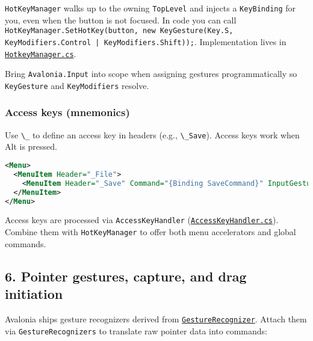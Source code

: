 \passthrough{\lstinline!HotKeyManager!} walks up to the owning
\passthrough{\lstinline!TopLevel!} and injects a
\passthrough{\lstinline!KeyBinding!} for you, even when the button is
not focused. In code you can call
\passthrough{\lstinline!HotKeyManager.SetHotKey(button, new KeyGesture(Key.S, KeyModifiers.Control | KeyModifiers.Shift));!}.
Implementation lives in
\href{https://github.com/AvaloniaUI/Avalonia/blob/master/src/Avalonia.Controls/HotkeyManager.cs}{\passthrough{\lstinline!HotkeyManager.cs!}}.

Bring \passthrough{\lstinline!Avalonia.Input!} into scope when assigning
gestures programmatically so \passthrough{\lstinline!KeyGesture!} and
\passthrough{\lstinline!KeyModifiers!} resolve.

\subsubsection{Access keys (mnemonics)}\label{access-keys-mnemonics}

Use \passthrough{\lstinline!\_!} to define an access key in headers
(e.g., \passthrough{\lstinline!\_Save!}). Access keys work when Alt is
pressed.

\begin{lstlisting}[language=XML]
<Menu>
  <MenuItem Header="_File">
    <MenuItem Header="_Save" Command="{Binding SaveCommand}" InputGesture="Ctrl+S"/>
  </MenuItem>
</Menu>
\end{lstlisting}

Access keys are processed via \passthrough{\lstinline!AccessKeyHandler!}
(\href{https://github.com/AvaloniaUI/Avalonia/blob/master/src/Avalonia.Controls/AccessKeyHandler.cs}{\passthrough{\lstinline!AccessKeyHandler.cs!}}).
Combine them with \passthrough{\lstinline!HotKeyManager!} to offer both
menu accelerators and global commands.

\subsection{6. Pointer gestures, capture, and drag
initiation}\label{pointer-gestures-capture-and-drag-initiation}

Avalonia ships gesture recognizers derived from
\href{https://github.com/AvaloniaUI/Avalonia/blob/master/src/Avalonia.Base/Input/GestureRecognizers/GestureRecognizer.cs}{\passthrough{\lstinline!GestureRecognizer!}}.
Attach them via \passthrough{\lstinline!GestureRecognizers!} to
translate raw pointer data into commands:

